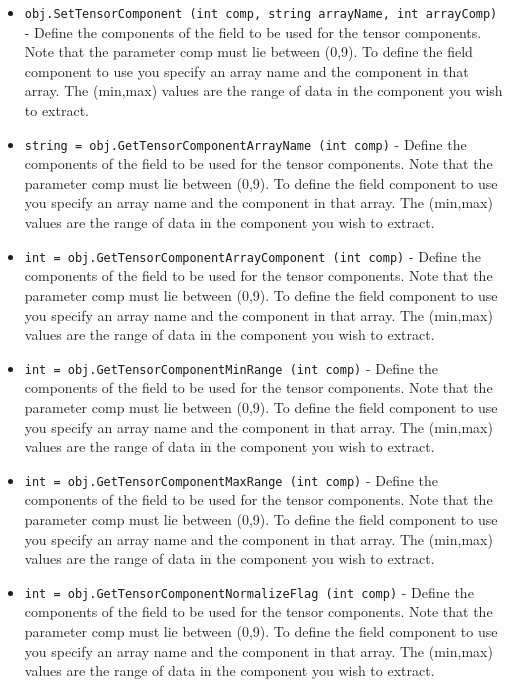 \begin{itemize}
\item  \verb|obj.SetTensorComponent (int comp, string arrayName, int arrayComp)| -  Define the components of the field to be used for the tensor
 components.  Note that the parameter comp must lie between (0,9). To
 define the field component to use you specify an array name and the
 component in that array. The (min,max) values are the range of data in
 the component you wish to extract.

\item  \verb|string = obj.GetTensorComponentArrayName (int comp)| -  Define the components of the field to be used for the tensor
 components.  Note that the parameter comp must lie between (0,9). To
 define the field component to use you specify an array name and the
 component in that array. The (min,max) values are the range of data in
 the component you wish to extract.

\item  \verb|int = obj.GetTensorComponentArrayComponent (int comp)| -  Define the components of the field to be used for the tensor
 components.  Note that the parameter comp must lie between (0,9). To
 define the field component to use you specify an array name and the
 component in that array. The (min,max) values are the range of data in
 the component you wish to extract.

\item  \verb|int = obj.GetTensorComponentMinRange (int comp)| -  Define the components of the field to be used for the tensor
 components.  Note that the parameter comp must lie between (0,9). To
 define the field component to use you specify an array name and the
 component in that array. The (min,max) values are the range of data in
 the component you wish to extract.

\item  \verb|int = obj.GetTensorComponentMaxRange (int comp)| -  Define the components of the field to be used for the tensor
 components.  Note that the parameter comp must lie between (0,9). To
 define the field component to use you specify an array name and the
 component in that array. The (min,max) values are the range of data in
 the component you wish to extract.

\item  \verb|int = obj.GetTensorComponentNormalizeFlag (int comp)| -  Define the components of the field to be used for the tensor
 components.  Note that the parameter comp must lie between (0,9). To
 define the field component to use you specify an array name and the
 component in that array. The (min,max) values are the range of data in
 the component you wish to extract.


\end{itemize}

